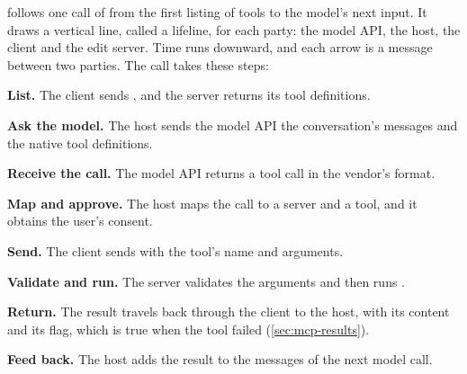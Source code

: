 follows one call of  from the first listing of tools to the
model's next input. It draws a vertical line, called a lifeline, for each party: the model API, the
host, the client and the edit server. Time runs downward, and each arrow is a message between two
parties. The call takes these steps:
\be
\item \textbf{List.} The client sends , and the server returns its tool
definitions.
\item \textbf{Ask the model.} The host sends the model API the conversation's messages and the
native tool definitions.
\item \textbf{Receive the call.} The model API returns a tool call in the vendor's format.
\item \textbf{Map and approve.} The host maps the call to a server and a tool, and it obtains the
user's consent.
\item \textbf{Send.} The client sends  with the tool's name and arguments.
\item \textbf{Validate and run.} The server validates the arguments and then runs .
\item \textbf{Return.} The result travels back through the client to the host, with its content and
its  flag, which is true when the tool failed (\cref{sec:mcp-results}).
\item \textbf{Feed back.} The host adds the result to the messages of the next model call.
\ee

